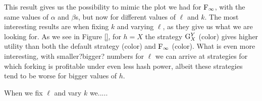 This result gives us the possibility to mimic the plot we had for ${\rm {F_\infty}}$, with the same values of $\alpha$ and $\beta$s, but now for different values of $\ell$ and $k$. The most interesting results are when 
fixing $k$ and varying $\ell$, as they give us what we are looking for. As we see in Figure \ref{}, for $h = X$ the strategy ${\rm {G}}_X^Y$ (color) gives higher utility 
than both the default strategy (color) and ${\rm {F_\infty}}$ (color). What is even more interesting, with smaller?bigger? numbers for $\ell$ we can arrive at strategies for which forking is profitable under even less hash power, albeit these strategies tend to be worse for bigger values of $h$. 

When we fix $\ell$ and vary $k$ we..... 



